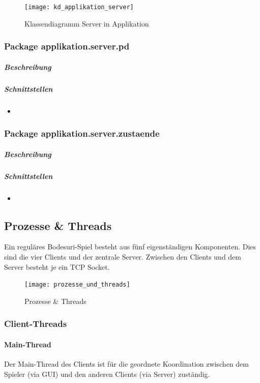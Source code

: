 \documentclass[12pt,halfparskip]{scrartcl}
\begin{document}
	\begin{figure}[h]
		\centering
		\texttt{[image: kd\_applikation\_server]}
		\caption{Klassendiagramm Server in Applikation}
		\label{fig:kd_applikation_server}
	\end{figure}
	
	\subsubsection{Package applikation.server.pd}
		\subparagraph{Beschreibung}

		\subparagraph{Schnittstellen}
		\begin{itemize}
			\item 
		\end{itemize}
	
	\subsubsection{Package applikation.server.zustaende}
		\subparagraph{Beschreibung}

		\subparagraph{Schnittstellen}
		\begin{itemize}
			\item 
		\end{itemize}	

\subsection{Prozesse \& Threads}
Ein reguläres Bodesuri-Spiel besteht aus fünf eigenständigen Komponenten. Dies sind die vier Clients und der zentrale Server. Zwischen den Clients und dem Server besteht je ein TCP Socket. 

\begin{figure}[h]
	\centering
	\texttt{[image: prozesse\_und\_threads]}
	\caption{Prozesse \& Threads}
	\label{fig:prozesse_und_threads}
\end{figure}

\clearpage
\subsubsection{Client-Threads}
\label{ssub:client_threads}

\paragraph{Main-Thread}
\label{ssub:main_thread}

Der Main-Thread des Clients ist für die geordnete Koordination zwischen dem Spieler (via GUI) und den anderen Clients (via Server) zuständig.
\end{document}
